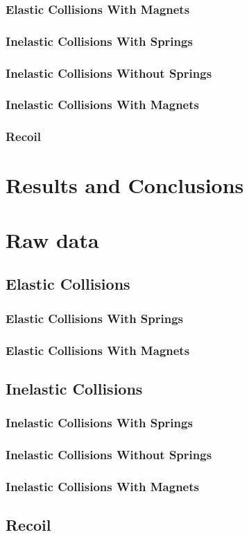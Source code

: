 \documentclass[12pt]{article}
\begin{document}
\subsubsection{Elastic Collisions With Magnets}
\subsubsection{Inelastic Collisions With Springs}
\subsubsection{Inelastic Collisions Without Springs}
\subsubsection{Inelastic Collisions With Magnets}
\subsubsection{Recoil}

\newpage
\section{Results and Conclusions}

\newpage
\appendix
\section{Raw data}
\subsection{Elastic Collisions}
\subsubsection{Elastic Collisions With Springs}
\subsubsection{Elastic Collisions With Magnets}
\subsection{Inelastic Collisions}
\subsubsection{Inelastic Collisions With Springs}
\subsubsection{Inelastic Collisions Without Springs}
\subsubsection{Inelastic Collisions With Magnets}
\subsection{Recoil}
\end{document}
